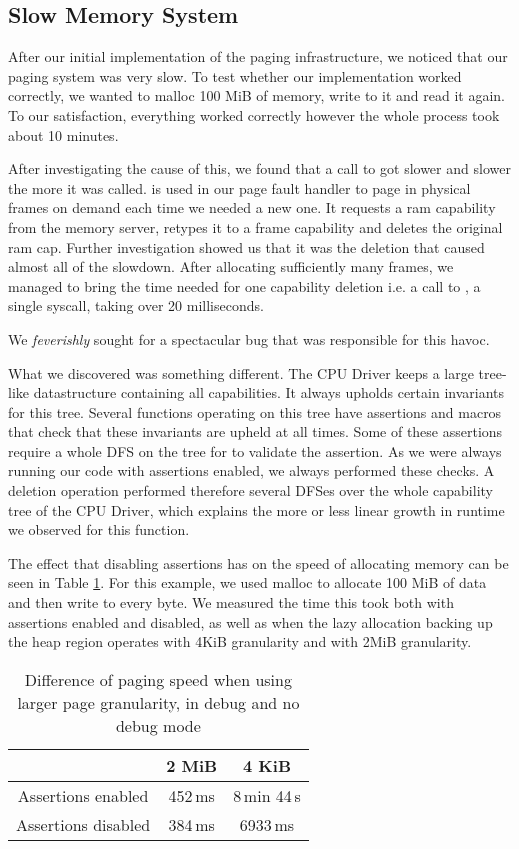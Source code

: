 \subsection{Slow Memory System}
\label{sec:slow_mem}

After our initial implementation of the paging infrastructure, we noticed that our paging system was very slow. To test whether our implementation worked
correctly, we wanted to malloc 100 MiB of memory, write to it and read it again. To our satisfaction, everything worked correctly
however the whole process took about 10 minutes.

After investigating the cause of this, we found that a call to  got slower and slower the more it was called.
 is used in our page fault handler to page in physical frames on demand each time we needed a new one. It requests a ram capability from the memory server,
retypes it to a frame capability and deletes the original ram cap.
Further investigation showed us that it was the deletion that caused almost all of the
slowdown. After allocating sufficiently many frames, we managed to bring the time
needed for one capability deletion i.e. a call to , a single syscall,
taking over 20 milliseconds.

We \textit{feverishly} sought for a spectacular bug that was responsible for this havoc.

What we discovered was something different.
The CPU Driver keeps a large tree-like datastructure containing all capabilities. It always upholds certain invariants for this tree. Several functions operating on this tree have assertions and macros
that check that these invariants are upheld at all times. Some of these assertions require  a whole DFS on the tree for to validate the assertion. As we were always running our code with
assertions enabled, we always performed these checks.
A deletion operation performed therefore several DFSes over the whole capability tree
of the CPU Driver, which explains the more or less linear growth in runtime we observed
for this function.

The effect that disabling assertions has on the speed of allocating memory
can be seen in Table \ref{table:large_paging}. For this example, we
used malloc to allocate 100 MiB of data and then write to every byte.
We measured the time this took both with assertions enabled and disabled,
as well as when the lazy allocation backing up the heap region operates with
4KiB granularity and with 2MiB granularity.
\begin{table}[h]
\begin{center}
\begin{tabular}{c c c} 
     &  2 MiB & 4 KiB \\ \hline 
Assertions enabled & 452\,ms  & 8\,min 44\,s \\\hline  
Assertions disabled  & 384\,ms & 6933\,ms \\  
\hline

\end{tabular}
\end{center}
\caption{Difference of paging speed when using larger page granularity, in debug and no debug mode}
\label{table:large_paging}
\end{table}
